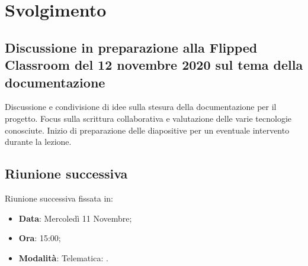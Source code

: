 \documentclass[]{article}
\begin{document}
\newpage

	\section{Svolgimento}
		\subsection{Discussione in preparazione alla Flipped Classroom del 12 novembre 2020 sul tema della documentazione}
		Discussione e condivisione di idee sulla stesura della documentazione per il progetto. Focus sulla scrittura collaborativa e valutazione delle varie tecnologie conosciute.
		Inizio di preparazione delle diapositive per un eventuale intervento durante la lezione.\\
		
		\subsection{Riunione successiva}
		Riunione successiva fissata in:
		\begin{itemize}
			\item \textbf{Data}: Mercoledì 11 Novembre;
			\item \textbf{Ora}: 15:00;
			\item \textbf{Modalità}: Telematica: .
		\end{itemize}
\end{document}
